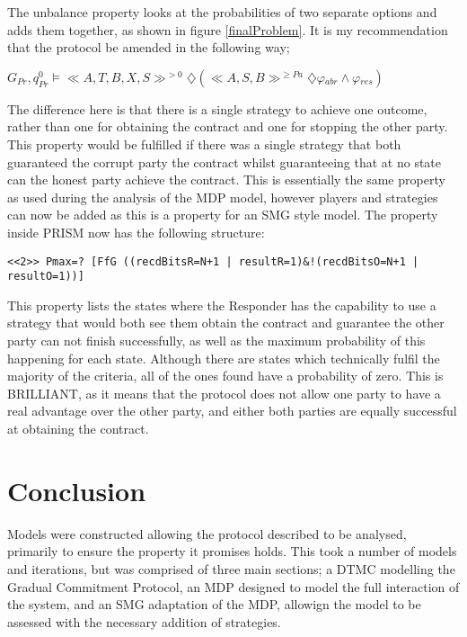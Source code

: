 \documentclass{l4proj}
\begin{document}
The unbalance property looks at the probabilities of two separate options and adds them together, as shown in figure \ref{finalProblem}. It is my recommendation that the protocol be amended in the following way;\\

\centerline{$ G{_{Pr}},q_{Pr}^{0}\models  \ll A, T, B, X, S \gg ^{>0} \diamondsuit (\ll A, S, B \gg^{\ge Pa} \diamondsuit \varphi{_{abr}} \wedge \varphi{_{res}}) $}

The difference here is that there is a single strategy to achieve one outcome, rather than one for obtaining the contract and one for stopping the other party. This property would be fulfilled if there was a single strategy that both guaranteed the corrupt party the contract whilst guaranteeing that at no state can the honest party achieve the contract. This is essentially the same property as used during the analysis of the MDP model, however players and strategies can now be added as this is a property for an SMG style model. The property inside PRISM now has the following structure:
\begin{lstlisting}
<<2>> Pmax=? [FfG ((recdBitsR=N+1 | resultR=1)&!(recdBitsO=N+1 | resultO=1))]
\end{lstlisting}
This property lists the states where the Responder has the capability to use a strategy that would both see them obtain the contract and guarantee the other party can not finish successfully, as well as the maximum probability of this happening for each state. Although there are states which technically fulfil the majority of the criteria, all of the ones found have a probability of zero. This is BRILLIANT, as it means that the protocol does not allow one party to have a real advantage over the other party, and either both parties are equally successful at obtaining the contract. 



\chapter{Conclusion}

Models were constructed allowing the protocol described to be analysed, primarily to ensure the property it promises holds. This took a number of models and iterations, but was comprised of three main sections; a DTMC modelling the Gradual Commitment Protocol, an MDP designed to model the full interaction of the system, and an SMG adaptation of the MDP, allowign the model to be assessed with the necessary addition of strategies.
\end{document}

